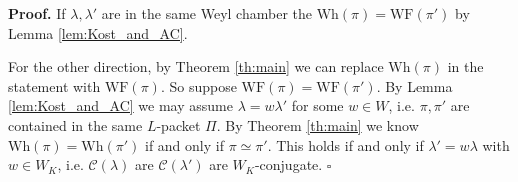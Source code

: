 \documentclass[10pt,leqno]{article}
\newcommand{\qed}{\hfill $\square$ \medskip}
\newenvironment{proof}[1][Proof]{\noindent\textbf{#1.} }{\qed}
\newcommand{\Norm}{\mathrm{Norm}}
\newcommand{\Wh}{\mathrm{Wh}}
\newcommand{\WF}{\mathrm{WF}}
\begin{document}
\begin{proof}
If $\lambda,\lambda'$ are in the same Weyl chamber the $\Wh(\pi)=\WF(\pi')$ by Lemma \ref{lem:Kost_and_AC}.

For the other direction, by Theorem \ref{th:main} we can replace
$\Wh(\pi)$ in the statement with $\WF(\pi)$.  So suppose
$\WF(\pi)=\WF(\pi')$. By Lemma \ref{lem:Kost_and_AC} we may assume
$\lambda=w\lambda'$ for some $w\in W$, i.e. $\pi,\pi'$ are contained
in the same $L$-packet $\Pi$. By Theorem \ref{th:main} 
we know $\Wh(\pi)=\Wh(\pi')$ if and only if $\pi\simeq \pi'$.
This holds if and only if $\lambda'=w\lambda$ with $w\in W_K$, 
i.e. $\mathcal C(\lambda)$ are $\mathcal C(\lambda')$ are $W_K$-conjugate.
\end{proof}
\begin{comment}
\subsection{Bonus}

This section uses the arguments above to deduce the ``folklore fact'' stated by  Jeff and Tasho with a reference to the present paper for the proof. \footnote{AA 2024-VI-7: I don't remember whether this was the most up-to-date version  of our understanding; I seem to remember that we wanted to know that $Q$ acts simply transitively on the large Weyl chambers, and I haven't thought yet about what the relationship this has with what is written below...}


We want to know that if $\pi_1=\pi(\lambda_1),\pi_2=\pi(\lambda_2)$ are large discrete series, then $\Wh(\pi_1)=\Wh(\pi_2)$ if and only $\lambda_1,\lambda_2$
are in the same Weyl chamber.

More precisely, $W$ and $W_K=\Norm_K(T)$ act on $T$, and $\pi(\lambda)=\pi(w\lambda)$ if and only if $\lambda\in W_K$.
So the correct statement is: $\Wh(\pi_1)=\Wh(\pi_2)$ if and only if the Weyl chambers of $\lambda_1,\lambda_2$ are conjugate by $W_K$.

One direction is easy using the above results: we have seen that if $\lambda_1,\lambda_2$
are in the same Weyl chamber then the wavefront set, therefore the Whittaker model, are the same. 

What we need to show:
$\Wh(\pi(\lambda_1))=\Wh(\pi(\lambda_2)\Rightarrow \mathcal C(\lambda_1)$ is $W_K$-conjugate to  $\mathcal C(\lambda_2)$.

We may as well assume $\pi(\lambda_1),\pi(\lambda_2)$ are in the same $L$-packet, i.e. $\lambda_2=w\lambda_1$ for some $w\in W$.We know that $Q$ acts simply transitively on the large discrete series in the $L$-packet, and on principal nilpotent orbits.
Also: this action is given by the action of $W$, i.e. if $g\in Q$ then $\pi(\lambda)^g=\pi(g\lambda)=\pi(w\lambda)$ for some $w\in W$.
So
$$
\Wh(\pi_1)=\Wh(\pi_2)\Leftrightarrow \pi_1\simeq \pi_2\Leftrightarrow \lambda_1\sim_{W_K}\lambda_2\Leftrightarrow \mathcal C_1\sim_{W_K}\mathcal C_2
$$
\end{comment}
\end{document}
